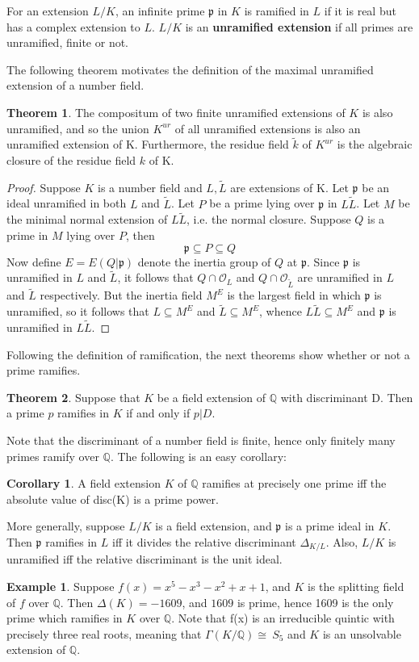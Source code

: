 \documentclass[12pt]{extarticle}
\newcommand{\Q}{\mathbb{Q}}
\newcommand{\GG}{\Gamma(K/\mathbb{Q})}
\newcommand{\<}{\langle}
\renewcommand{\>}{\rangle}
\theoremstyle{definition}
\newtheorem{theorem}{Theorem}
\newtheorem{corollary}{Corollary}
\newtheorem{example}{Example}
\begin{document}
For an extension $L/K$, an infinite prime $\mathfrak{p}$ in $K$ is ramified in $L$ if it is real but has a complex extension to $L$. $L/K$ is an \textbf{unramified extension} if all primes are unramified, finite or not. 
\par
The following theorem motivates the definition of the maximal unramified extension of a number field. 
\begin{theorem}
The compositum of two finite unramified extensions of $K$ is also unramified, and so the union $K^{ur}$ of all unramified extensions is also an unramified extension of K. Furthermore, the residue field $\tilde{k}$ of $K^{ur}$ is the algebraic closure of the residue field $k$ of K.
\end{theorem}
\begin{proof}
    Suppose $K$ is a number field and $L,\tilde{L}$ are extensions of K. Let $\mathfrak{p}$ be an ideal unramified in both $L$ and $\tilde{L}$. Let $P$ be a prime lying over $\mathfrak{p}$ in $L\tilde{L}$. Let $M$ be the minimal normal extension of $L\tilde{L}$, i.e. the normal closure. Suppose $Q$ is a prime in $M$ lying over $P$, then  
    \begin{equation}
        \mathfrak{p}\subseteq P \subseteq Q
    \end{equation}
    Now define $E=E(Q|\mathfrak{p})$ denote the inertia group of $Q$ at $\mathfrak{p}$. 
    Since $\mathfrak{p}$ is unramified in $L$ and $\tilde{L}$, it follows that $Q \cap \mathcal{O}_L$ and $Q \cap \mathcal{O}_{\tilde{L}}$ are unramified in $L$ and $\tilde{L}$ respectively. 
 But the inertia field $M^E$ is the largest field in which $\mathfrak{p}$ is unramified, so it follows that $L\subseteq M^E$ and $\tilde{L} \subseteq M^E $, whence $L\tilde{L}\subseteq M^E$ and $\mathfrak{p}$ is unramified in $L\tilde{L}$.
\end{proof}
Following the definition of ramification, the next theorems show whether or not a prime ramifies.
\begin{theorem}
 Suppose that $K$ be a field extension of $\Q$ with discriminant D. Then a prime $p$
ramifies in $K$ if and only if $p|D$.   
\end{theorem}
Note that the discriminant of a number field is finite, hence only finitely many primes ramify over $\Q$. The following is an easy corollary:
\begin{corollary}
A field extension $K$ of $\Q$ ramifies at precisely one prime iff the absolute value of disc(K) is a prime power.
\end{corollary}
More generally, suppose $L/K$ is a field extension, and $\mathfrak{p}$ is a prime ideal in $K$. Then $\mathfrak{p}$ ramifies in $L$ iff it divides the relative discriminant $\Delta_{K/L}$. Also, $L/K$ is unramified iff the relative discriminant is the unit ideal. 
\begin{example}
    Suppose $f(x)= x^5 - x^3 - x^2 + x + 1$, and $K$ is the splitting field of $f$ over $\Q$. Then $\Delta(K)=-1609$, and $1609$ is prime, hence 1609 is the only prime which ramifies in $K$ over $\Q$. Note that f(x) is an irreducible quintic with precisely three real roots, meaning that $\GG \cong\ S_5$ and $K$ is an unsolvable extension of $\Q$.
\end{example}
\end{document}
